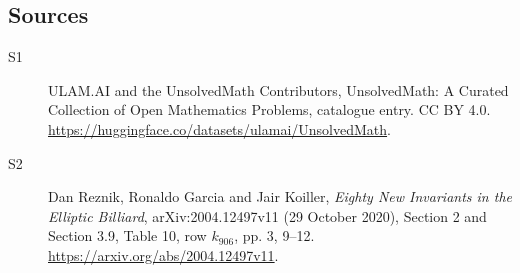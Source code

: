 \documentclass[11pt]{article}
\begin{document}
\subsection{Sources}
\begin{description}
\item[\hypertarget{source:statement:1}{S1}] ULAM.AI and the UnsolvedMath Contributors, UnsolvedMath: A Curated Collection of Open Mathematics Problems, catalogue entry. CC BY 4.0. \url{https://huggingface.co/datasets/ulamai/UnsolvedMath}.
\item[\hypertarget{source:statement:2}{S2}] Dan Reznik, Ronaldo Garcia and Jair Koiller, \emph{Eighty New Invariants in the Elliptic Billiard}, arXiv:2004.12497v11 (29 October 2020), Section 2 and Section 3.9, Table 10, row $k_{906}$, pp. 3, 9--12. \url{https://arxiv.org/abs/2004.12497v11}.
\end{description}
\label{end:statement}
\end{document}
